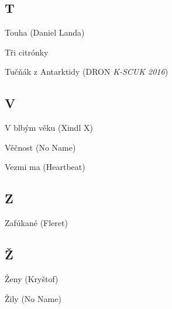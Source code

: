 \newpage
\begin{multicols}{2}


\subsection*{T}
Touha (Daniel Landa)

Tři citrónky

Tučňák z Antarktidy (DRON \emph{K-SCUK 2016})

\subsection*{V}
V blbým věku (Xindl X)

Věčnost (No Name)

Vezmi ma (Heartbeat)

\subsection*{Z}
Zafúkané (Fleret)

\subsection*{Ž}
Ženy (Kryštof)

Žily (No Name)

\end{multicols}

\newpage
